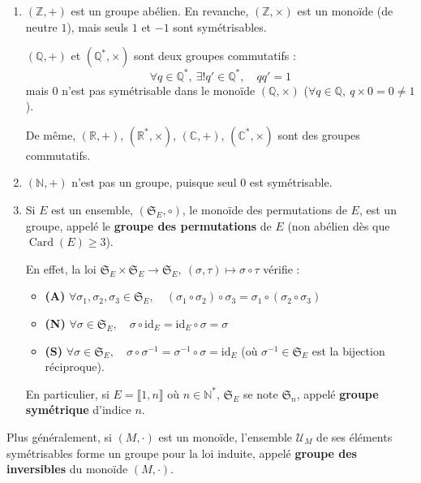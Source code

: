 \documentclass[a4paper,11pt]{article}
\newcommand{\R}{\mathbb{R}}
\newcommand{\C}{\mathbb{C}}
\newcommand{\N}{\mathbb{N}}
\newcommand{\Z}{\mathbb{Z}}
\newcommand{\Q}{\mathbb{Q}}
\newcommand{\intEnt}[2]{\llbracket #1, #2 \rrbracket}
\DeclareMathOperator{\Card}{Card}
\newcommand{\mot}[1]{\textcolor{bordeaux}{\textbf{#1}}}
\begin{document}
\begin{exemples}
\begin{enumerate}
    \item $(\Z, +)$ est un groupe abélien. En revanche, $(\Z, \times)$ est un monoïde (de neutre $1$), mais seuls $1$ et $-1$ sont symétrisables.
    
    $(\Q, +)$ et $(\Q^*, \times)$ sont deux groupes commutatifs :
    \[
    \forall q \in \Q^*, \ \exists! q' \in \Q^*, \quad qq' = 1
    \]
    mais $0$ n'est pas symétrisable dans le monoïde $(\Q, \times)$ ($\forall q \in \Q, \ q \times 0 = 0 \neq 1$).
    
    De même, $(\R, +)$, $(\R^*, \times)$, $(\C, +)$, $(\C^*, \times)$ sont des groupes commutatifs.
    
    \item $(\N, +)$ n'est pas un groupe, puisque seul $0$ est symétrisable.
    
    \item Si $E$ est un ensemble, $(\mathfrak{S}_E, \circ)$, le monoïde des permutations de $E$, est un groupe, appelé le \mot{groupe des permutations} de $E$ (non abélien dès que $\Card(E) \ge 3$).
    
    En effet, la loi $\mathfrak{S}_E \times \mathfrak{S}_E \to \mathfrak{S}_E, \ (\sigma, \tau) \mapsto \sigma \circ \tau$ vérifie :
    \begin{itemize}
        \item \textbf{(A)} $\forall \sigma_1, \sigma_2, \sigma_3 \in \mathfrak{S}_E, \quad (\sigma_1 \circ \sigma_2) \circ \sigma_3 = \sigma_1 \circ (\sigma_2 \circ \sigma_3)$
        \item \textbf{(N)} $\forall \sigma \in \mathfrak{S}_E, \quad \sigma \circ \mathrm{id}_E = \mathrm{id}_E \circ \sigma = \sigma$
        \item \textbf{(S)} $\forall \sigma \in \mathfrak{S}_E, \quad \sigma \circ \sigma^{-1} = \sigma^{-1} \circ \sigma = \mathrm{id}_E$ (où $\sigma^{-1} \in \mathfrak{S}_E$ est la bijection réciproque).
    \end{itemize}
    En particulier, si $E = \intEnt{1}{n}$ où $n \in \N^*$, $\mathfrak{S}_E$ se note $\mathfrak{S}_n$, appelé \mot{groupe symétrique} d'indice $n$.
\end{enumerate}
\end{exemples}

\begin{proposition}
Plus généralement, si $(M, \cdot)$ est un monoïde, l'ensemble $\mathcal{U}_M$ de ses éléments symétrisables forme un groupe pour la loi induite, appelé \mot{groupe des inversibles} du monoïde $(M, \cdot)$.
\end{proposition}
\end{document}
